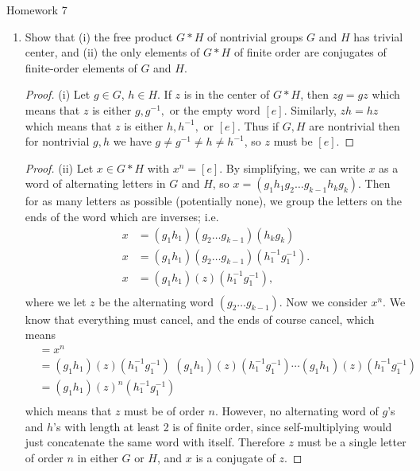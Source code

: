 \documentclass[12pt,letterpaper]{article}
\begin{document}
\pagestyle{fancy}
\begin{center}
{\Large Homework 7}%
\end{center}

\begin{enumerate}


\item Show that (i) the free product $G*H$ of nontrivial groups $G$ and $H$ has trivial center, and (ii) the only elements of $G*H$ of finite order are conjugates of finite-order elements of $G$ and $H$. 
\begin{proof}(i)
Let $g\in G$, $h\in H$. If $z$ is in the center of $G*H$, then $zg=gz$ which means that $z$ is either $g, g^{-1},$ or the empty word $[e]$. Similarly, $zh=hz$ which means that $z$ is either $h, h^{-1},$ or $[e]$. Thus if $G,H$ are nontrivial then for nontrivial $g,h$ we have $g\neq g^{-1}\neq h\neq h^{-1}$, so $z$ must be $[e]$. 
\end{proof}
\begin{proof}(ii)
Let $x\in G*H$ with $x^n=[e]$. By simplifying, we can write $x$ as a word of alternating letters in $G$ and $H$, so $x=(g_1h_1g_2\dots g_{k-1}h_kg_k)$. Then for as many letters as possible (potentially none), we group the letters on the ends of the word which are inverses; i.e. 
\begin{align*}
x&=(g_1h_1)(g_2\dots g_{k-1})(h_kg_k)\\
x&=(g_1h_1)(g_2\dots g_{k-1})(h_1^{-1}g_1^{-1}).\\
x&=(g_1h_1)(z)(h_1^{-1}g_1^{-1}),\\
\end{align*}
where we let $z$ be the alternating word $(g_2\dots g_{k-1})$. Now we consider $x^n$. We know that everything must cancel, and the ends of course cancel, which means 
\begin{align*}
[e]&=x^n \\
&=(g_1h_1)(z)(h_1^{-1}g_1^{-1}) \, \, 
(g_1h_1)(z)(h_1^{-1}g_1^{-1}) \cdots
(g_1h_1)(z)(h_1^{-1}g_1^{-1})\\
&=(g_1h_1)(z)^n(h_1^{-1}g_1^{-1})\\
\end{align*}
which means that $z$ must be of order $n$. However, no  alternating word of $g$'s and $h$'s with length at least 2 is of finite order, since self-multiplying would just concatenate the same word with itself. Therefore $z$ must be a single letter of order $n$ in either $G$ or $H$, and $x$ is a conjugate of $z$. 
\end{proof}


\end{enumerate}
\end{document}
